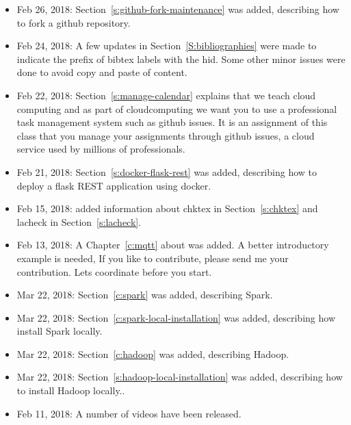 \begin{itemize}
\item Feb 26, 2018: Section~\ref{s:github-fork-maintenance} was added,
  describing how to fork a github repository.

\item Feb 24, 2018: A few updates in Section~\ref{S:bibliographies}
  were made to indicate the prefix of bibtex labels with the hid. Some
  other minor issues were done to avoid copy and paste of content.

\item Feb 22, 2018: Section~\ref{s:manage-calendar} explains that we
  teach cloud computing and as part of cloudcomputing we want you to
  use a professional task management system such as github issues. It
  is an assignment of this class that you manage your assignments
  through github issues, a cloud service used by millions of
  professionals.

\item Feb 21, 2018: Section~\ref{s:docker-flask-rest} was added,
    describing  how to deploy a flask REST
    application using docker. 

\item Feb 15, 2018: added information about chktex in
  Section~\ref{s:chktex} and lacheck in Section~\ref{s:lacheck}.

\item Feb 13, 2018: A Chapter~\ref{c:mqtt} about was added. A better
  introductory example is needed, If you like to contribute, please
  send me your contribution. Lets coordinate before you start.

\item Mar 22, 2018: Section~\ref{c:spark} was added,
  describing Spark.

\item Mar 22, 2018: Section~\ref{c:spark-local-installation} was added,
  describing how install Spark locally.

\item Mar 22, 2018: Section~\ref{c:hadoop} was added,
  describing Hadoop.

\item Mar 22, 2018: Section~\ref{s:hadoop-local-installation} was added,
  describing how to install Hadoop locally..


\item Feb 11, 2018: A number of videos have been released.


\end{itemize}
